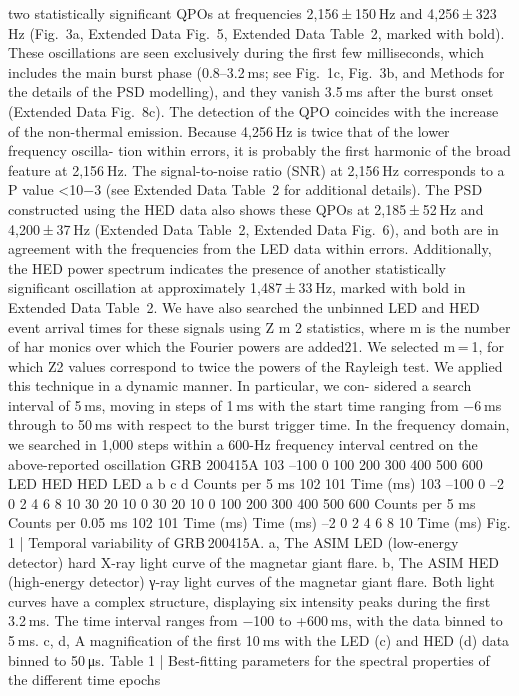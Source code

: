 two statistically significant QPOs at frequencies 2,156 ± 150 Hz and
4,256 ± 323 Hz (Fig. 3a, Extended Data Fig. 5, Extended Data Table 2,
marked with bold). These oscillations are seen exclusively during the
first few milliseconds, which includes the main burst phase (0.8–3.2 ms;
see Fig. 1c, Fig. 3b, and Methods for the details of the PSD modelling),
and they vanish 3.5 ms after the burst onset (Extended Data Fig. 8c).
The detection of the QPO coincides with the increase of the non-thermal
emission. Because 4,256 Hz is twice that of the lower frequency oscilla-
tion within errors, it is probably the first harmonic of the broad feature
at 2,156 Hz. The signal-to-noise ratio (SNR) at 2,156 Hz corresponds
to a P value <10−3 (see Extended Data Table 2 for additional details).
The PSD constructed using the HED data also shows these QPOs at
2,185 ± 52 Hz and 4,200 ± 37 Hz (Extended Data Table 2, Extended Data
Fig. 6), and both are in agreement with the frequencies from the LED
data within errors. Additionally, the HED power spectrum indicates the
presence of another statistically significant oscillation at approximately
1,487 ± 33 Hz, marked with bold in Extended Data Table 2.
We have also searched the unbinned LED and HED event arrival times
for these signals using Z m
2  statistics, where m is the number of har­
monics over which the Fourier powers are added21. We selected m = 1,
for which Z2 values correspond to twice the powers of the Rayleigh test.
We applied this technique in a dynamic manner. In particular, we con-
sidered a search interval of 5 ms, moving in steps of 1 ms with the start
time ranging from −6 ms through to 50 ms with respect to the burst
trigger time. In the frequency domain, we searched in 1,000 steps within
a 600-Hz frequency interval centred on the above-reported oscillation
GRB 200415A
103
–100
0
100
200
300
400
500
600
LED
HED
HED
LED
a
b
c
d
Counts per 5 ms
102
101
Time (ms)
103
–100
0
–2
0
2
4
6
8
10
30
20
10
0
30
20
10
0
100
200
300
400
500
600
Counts per 5 ms
Counts per 0.05 ms
102
101
Time (ms)
Time (ms)
–2
0
2
4
6
8
10
Time (ms)
Fig. 1 | Temporal variability of GRB 200415A. a, The ASIM LED (low-energy detector)
hard X-ray light curve of the magnetar giant flare. b, The ASIM HED (high-energy
detector) γ-ray light curves of the magnetar giant flare. Both light curves have a
complex structure, displaying six intensity peaks during the first 3.2 ms.
The time interval ranges from −100 to +600 ms, with the data binned to 5 ms.
c, d, A magnification of the first 10 ms with the LED (c) and HED (d) data binned to 50 μs.
Table 1 | Best-fitting parameters for the spectral properties of the different time epochs
